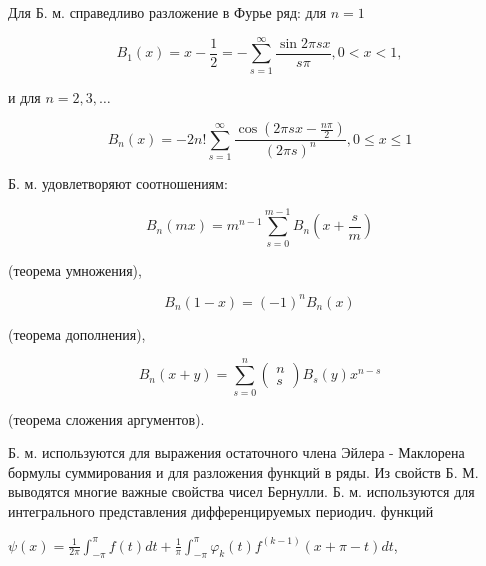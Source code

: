 \documentclass[10pt]{article}
\begin{document}
Для Б. м. справедливо разложение в Фурье ряд: для $n=1$



\[

B_{1}(x)=x-\frac{1}{2}=-\sum_{s=1}^{\infty} \frac{\sin 2 \pi s x}{s \pi}, 0<x<1,

\]



и для $n=2,3, \ldots$



\[

B_{n}(x)=-2 n ! \sum_{s=1}^{\infty} \frac{\cos \left(2 \pi s x-\frac{n \pi}{2}\right)}{(2 \pi s)^{n}}, 0 \leqslant x \leqslant 1

\]



Б. м. удовлетворяют соотношениям:



\[

B_{n}(m x)=m^{n-1} \sum_{s=0}^{m-1} B_{n}\left(x+\frac{s}{m}\right)

\]



(теорема умножения),



\[

B_{n}(1-x)=(-1)^{n} B_{n}(x)

\]



(теорема дополнения),



\[

B_{n}(x+y)=\sum_{s=0}^{n}\left(\begin{array}{l}

n \\

s

\end{array}\right) B_{s}(y) x^{n-s}

\]



(теорема сложения аргументов).



Б. м. используются для выражения остаточного члена Эйлера - Маклорена бормулы суммирования и для разложения функций в ряды. Из свойств Б. М. выводятся многие важные свойства чисел Бернулли. Б. м. используются для интегрального представления дифференцируемых периодич. функций



$\psi(x)=\frac{1}{2 \pi} \int_{-\pi}^{\pi} f(t) d t+\frac{1}{\pi} \int_{-\pi}^{\pi} \varphi_{k}(t) f^{(k-1)}(x+\pi-t) d t$,
\end{document}
